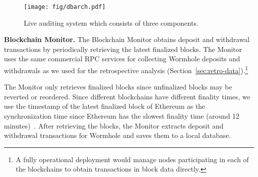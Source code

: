 \begin{figure}[t]
\centering
\texttt{[image: fig/dbarch.pdf]}
\caption[Live Auditing System Architecture]{Live auditing system which consists of three components.}
\label{fig:live-audit-arch}
\end{figure}

\textbf{Blockchain Monitor.}
%
The Blockchain Monitor obtains deposit and withdrawal transactions by
periodically retrieving the latest finalized blocks.  The Monitor
uses the same commercial RPC services for collecting
Wormhole deposits and withdrawals as we used for the retrospective
analysis (Section~\ref{sec:retro-data}).\footnote{A fully operational
deployment would manage nodes participating in each of the blockchains
to obtain transactions in block data directly.}

The Monitor only retrieves finalized blocks since unfinalized blocks
may be reverted or reordered.  Since different blockchains have
different finality times, we use the timestamp of the latest finalized
block of Ethereum as the synchronization time since Ethereum has the
slowest finality time (around 12 minutes)~\cite{Finality:online}.
After retrieving the blocks, the Monitor extracts deposit and
withdrawal transactions for Wormhole and saves them to a local
database.

